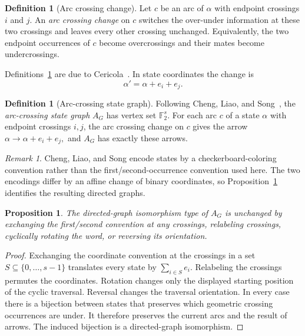\documentclass[11pt]{amsart}
\newtheorem{proposition}[theorem]{Proposition}
\theoremstyle{definition}
\newtheorem{definition}[theorem]{Definition}
\theoremstyle{remark}
\newtheorem{remark}[theorem]{Remark}
\newcommand{\F}{\mathbb F_2}
\begin{document}
\begin{definition}[Arc crossing change]\label{def:arc-change}
Let \(c\) be an arc of $\alpha$ with endpoint crossings \(i\) and \(j\).  An \emph{arc
crossing change} on \(c\) switches the over-under information at these two
crossings and leaves every other crossing unchanged.  Equivalently, the two
endpoint occurrences of \(c\) become overcrossings and their mates become
undercrossings.
\end{definition}

Definitions~\ref{def:arc-change} are due to
Cericola~\cite[Section~2.1]{Cericola2024}.  In state coordinates the change is
\begin{equation}\label{eq:move}
  \alpha'=\alpha+e_i+e_j.
\end{equation}
\begin{definition}[Arc-crossing state graph]\label{def:AG}
Following Cheng, Liao, and Song~\cite[Section~4.1]{ChengLiaoSong2025}, the
\emph{arc-crossing state graph} \(A_G\) has vertex set \(\F^s\).  For each
arc \(c\) of a state \(\alpha\) with endpoint crossings \(i,j\), the arc
crossing change on \(c\) gives the arrow
$
  \alpha\longrightarrow\alpha+e_i+e_j,
$
 and \(A_G\) has exactly these arrows.
\end{definition}

\begin{remark}\label{rem:checkerboard}
Cheng, Liao, and Song encode states by a checkerboard-coloring convention
rather than the first/second-occurrence convention used here.  The two encodings differ by an affine
change of binary coordinates, so Proposition~\ref{prop:encoding}
identifies the resulting directed graphs.
\end{remark}


\begin{proposition}\label{prop:encoding}
The directed-graph isomorphism type of \(A_G\) is unchanged by exchanging the
first/second convention at any crossings, relabeling crossings, cyclically
rotating the word, or reversing its orientation.
\end{proposition}

\begin{proof}
Exchanging the coordinate convention at the crossings in a set
\(S\subseteq\{0,\ldots,s-1\}\) translates every state by
\(\sum_{i\in S}e_i\).  Relabeling the crossings permutes the coordinates.
Rotation changes only the displayed starting position of the cyclic
traversal.  Reversal changes the traversal orientation.  In every case there
is a bijection between states that preserves which geometric crossing
occurrences are under.  It therefore preserves the current arcs and the
result of arrows.  The induced bijection is a
directed-graph isomorphism.
\end{proof}
\end{document}
